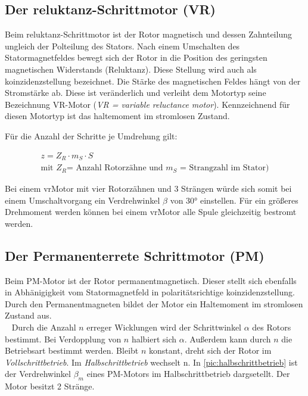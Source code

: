 \newpage

\subsection{Der \acrshort{reluktanz}-Schrittmotor (VR)}

Beim \acrshort{reluktanz}-Schrittmotor ist der Rotor magnetisch und dessen Zahnteilung ungleich der Polteilung des Stators. Nach einem Umschalten des Statormagnetfeldes bewegt sich der Rotor in die Position des geringsten magnetischen Widerstands (Reluktanz). Diese Stellung wird auch als \acrshort{koinzidenzstellung} bezeichnet. Die Stärke des magnetischen Feldes hängt von der Stromstärke ab. Diese ist veränderlich und verleiht dem Motortyp seine Bezeichnung VR-Motor (\textit{VR = variable reluctance motor}). Kennzeichnend für diesen Motortyp ist das \acrshort{haltemoment} im stromlosen Zustand. 

Für die Anzahl der Schritte je Umdrehung gilt: 

\begin{align}
	z = Z_R\cdot m_S \cdot S \\
	\text{mit } Z_R \text{= Anzahl Rotorzähne und } m_S \text{ = Strangzahl im Stator})
\end{align}

Bei einem \acrshort{vrMotor} mit vier Rotorzähnen und 3 Strängen würde sich somit bei einem Umschaltvorgang ein Verdrehwinkel $\beta$ von 30° einstellen. Für ein größeres Drehmoment werden können bei einem \acrshort{vrMotor} alle Spule gleichzeitig bestromt werden. 

\subsection{Der Permanenterrete Schrittmotor (PM)}
Beim PM-Motor ist der Rotor permanentmagnetisch. Dieser stellt sich ebenfalls in Abhänigigkeit vom Statormagnetfeld in polaritätsrichtige \acrshort{koinzidenzstellung}. Durch den Permanentmagneten bildet der Motor ein Haltemoment im stromlosen Zustand aus. \\ 
Durch die Anzahl $n$ erreger Wicklungen wird der Schrittwinkel $\alpha$ des Rotors bestimmt. Bei Verdopplung von $n$ halbiert sich $\alpha$. Außerdem kann durch $n$ die Betriebsart bestimmt werden. Bleibt $n$ konstant, dreht sich der Rotor im \textit{Vollschrittbetrieb}. Im \textit{Halbschrittbetrieb} wechselt n. In \autoref{pic:halbschrittbetrieb} ist der Verdrehwinkel $\beta_m$ eines PM-Motors im Halbschrittbetrieb dargsetellt. Der Motor besitzt 2 Stränge.  

